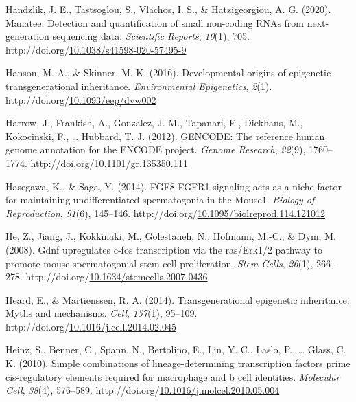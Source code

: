 \documentclass[12pt,twoside]{reedthesis}
\newlength{\cslhangindent}
\newenvironment{CSLReferences}[2] %
 {%
  \setlength{\parindent}{0pt}
  \ifodd #1 \everypar{\setlength{\hangindent}{\cslhangindent}}\ignorespaces\fi
  \ifnum #2 > 0
  \setlength{\parskip}{#2\baselineskip}
  \fi
 }%
 {}
\begin{document}
\begin{CSLReferences}{1}{0}
\leavevmode{}%
Handzlik, J. E., Tastsoglou, S., Vlachos, I. S., \& Hatzigeorgiou, A. G. (2020). Manatee: Detection and quantification of small non-coding RNAs from next-generation sequencing data. \emph{Scientific Reports}, \emph{10}(1), 705. http://doi.org/\href{https://doi.org/10.1038/s41598-020-57495-9}{10.1038/s41598-020-57495-9}

\leavevmode{}%
Hanson, M. A., \& Skinner, M. K. (2016). Developmental origins of epigenetic transgenerational inheritance. \emph{Environmental Epigenetics}, \emph{2}(1). http://doi.org/\href{https://doi.org/10.1093/eep/dvw002}{10.1093/eep/dvw002}

\leavevmode{}%
Harrow, J., Frankish, A., Gonzalez, J. M., Tapanari, E., Diekhans, M., Kokocinski, F., \ldots{} Hubbard, T. J. (2012). GENCODE: The reference human genome annotation for the ENCODE project. \emph{Genome Research}, \emph{22}(9), 1760--1774. http://doi.org/\href{https://doi.org/10.1101/gr.135350.111}{10.1101/gr.135350.111}

\leavevmode{}%
Hasegawa, K., \& Saga, Y. (2014). FGF8-FGFR1 signaling acts as a niche factor for maintaining undifferentiated spermatogonia in the Mouse1. \emph{Biology of Reproduction}, \emph{91}(6), 145--146. http://doi.org/\href{https://doi.org/10.1095/biolreprod.114.121012}{10.1095/biolreprod.114.121012}

\leavevmode{}%
He, Z., Jiang, J., Kokkinaki, M., Golestaneh, N., Hofmann, M.-C., \& Dym, M. (2008). Gdnf upregulates c-fos transcription via the ras/Erk1/2 pathway to promote mouse spermatogonial stem cell proliferation. \emph{Stem Cells}, \emph{26}(1), 266--278. http://doi.org/\href{https://doi.org/10.1634/stemcells.2007-0436}{10.1634/stemcells.2007-0436}

\leavevmode{}%
Heard, E., \& Martienssen, R. A. (2014). Transgenerational epigenetic inheritance: Myths and mechanisms. \emph{Cell}, \emph{157}(1), 95--109. http://doi.org/\href{https://doi.org/10.1016/j.cell.2014.02.045}{10.1016/j.cell.2014.02.045}

\leavevmode{}%
Heinz, S., Benner, C., Spann, N., Bertolino, E., Lin, Y. C., Laslo, P., \ldots{} Glass, C. K. (2010). Simple combinations of lineage-determining transcription factors prime cis-regulatory elements required for macrophage and b cell identities. \emph{Molecular Cell}, \emph{38}(4), 576--589. http://doi.org/\href{https://doi.org/10.1016/j.molcel.2010.05.004}{10.1016/j.molcel.2010.05.004}


\end{CSLReferences}
\end{document}
